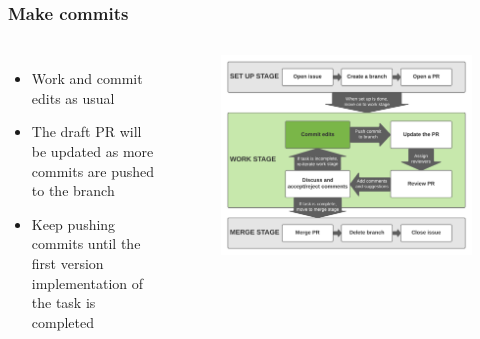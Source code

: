 \documentclass[aspectratio=169]{beamer} %
\begin{document}
\begin{frame}
	\frametitle{Make commits}
	\begin{columns}[c]
		
		\begin{itemize}
			\setlength\itemsep{1em}
			\item Work and commit edits as usual
			\item The draft PR will be updated as more commits are pushed to the branch		
			\item Keep pushing commits until the first version implementation of the task is completed
		\end{itemize}
		
		\vspace{-.75cm}
		\begin{figure}
			\centering
			\includegraphics[width=\textwidth]{./img/branch-pr-merge-cycle-S2-1.png}
		\end{figure}
		
	\end{columns}
\end{frame}
\end{document}
